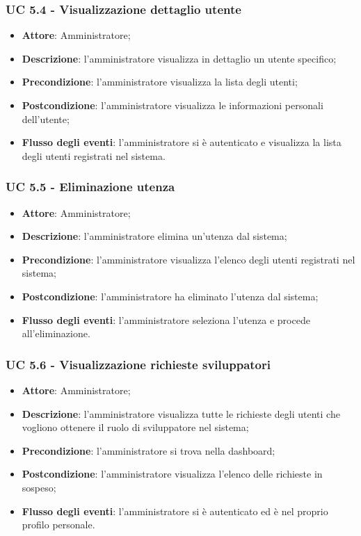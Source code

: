 \subsubsection{UC 5.4 - Visualizzazione dettaglio utente}
\begin{itemize}
\item \textbf{Attore}: Amministratore;
\item \textbf{Descrizione}: l'amministratore visualizza in dettaglio un utente specifico;
\item \textbf{Precondizione}: l'amministratore visualizza la lista degli utenti;
\item \textbf{Postcondizione}: l'amministratore visualizza le informazioni personali dell'utente;
\item \textbf{Flusso degli eventi}: l'amministratore si è autenticato e visualizza la lista degli utenti registrati nel sistema.
\end{itemize}


\subsubsection{UC 5.5 - Eliminazione utenza}
\begin{itemize}
\item \textbf{Attore}: Amministratore;
\item \textbf{Descrizione}: l'amministratore elimina un'utenza dal sistema;
\item \textbf{Precondizione}: l'amministratore visualizza l'elenco degli utenti registrati nel sistema;
\item \textbf{Postcondizione}: l'amministratore ha eliminato l'utenza dal sistema;
\item \textbf{Flusso degli eventi}: l'amministratore seleziona l'utenza e procede all'eliminazione.
\end{itemize}


\subsubsection{UC 5.6 - Visualizzazione richieste sviluppatori}
\begin{itemize}
\item \textbf{Attore}: Amministratore;
\item \textbf{Descrizione}: l'amministratore visualizza tutte le richieste degli utenti che vogliono ottenere il ruolo di sviluppatore nel sistema;
\item \textbf{Precondizione}: l'amministratore si trova nella dashboard;
\item \textbf{Postcondizione}: l'amministratore visualizza l'elenco delle richieste in sospeso;
\item \textbf{Flusso degli eventi}: l'amministratore si è autenticato ed è nel proprio profilo personale.
\end{itemize}

